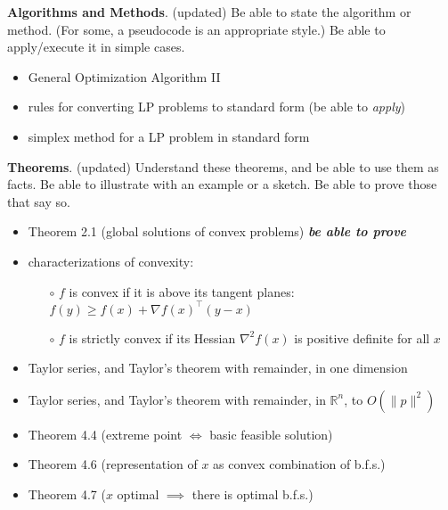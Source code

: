 \documentclass[12pt]{amsart}
\newcommand{\bigspacing}{\renewcommand{\baselinestretch}{1.13}\tiny\normalsize}
\newcommand{\RR}{{\mathbb{R}}}
\newcommand{\grad}{\nabla}
\begin{document}
\bigspacing
\noindent \textbf{Algorithms and Methods}.  {\color{BrickRed} (updated)}  Be able to state the algorithm or method.  (For some, a pseudocode is an appropriate style.)  Be able to apply/execute it in simple cases.
\begin{itemize}
\item General Optimization Algorithm II 
\item rules for converting LP problems to standard form (be able to \emph{apply}) 
\item simplex method for a LP problem in standard form 
\end{itemize}


\newcommand{\proveit}{\quad\textbf{\emph{be able to prove}}}

\newpage
\medskip
\noindent \textbf{Theorems}.  {\color{BrickRed} (updated)}  Understand these theorems, and be able to use them as facts.  Be able to illustrate with an example or a sketch.  Be able to prove those that say so.
\begin{itemize}
\item Theorem 2.1 (global solutions of convex problems) \proveit {}
\item characterizations of convexity: 
    \begin{itemize}
    \item[$\circ$] $f$ is convex if it is above its tangent planes: $f(y) \ge f(x) + \grad f(x)^\top (y-x)$
    \item[$\circ$] $f$ is strictly convex if its Hessian $\grad^2 f(x)$ is positive definite for all $x$
    \end{itemize}
\item Taylor series, and Taylor's theorem with remainder, in one dimension 
\item Taylor series, and Taylor's theorem with remainder, in $\RR^n$, to $O(\|p\|^2)$ 
\item Theorem 4.4 (extreme point $\iff$ basic feasible solution) 
\item Theorem 4.6 (representation of $x$ as convex combination of b.f.s.) 
\item Theorem 4.7 ($x$ optimal $\implies$ there is optimal b.f.s.) 
\end{itemize}
\end{document}
